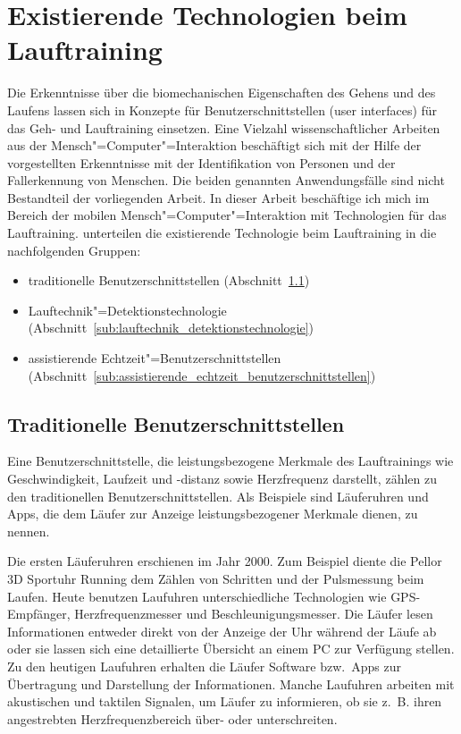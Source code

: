 

\section{Existierende Technologien beim Lauftraining} 

\label{sec:existierende_technologien_beim_lauftraining}

Die Erkenntnisse über die biomechanischen Eigenschaften des Gehens und des Laufens lassen sich in Konzepte für Benutzerschnittstellen (user interfaces) für das Geh- und Lauftraining einsetzen. Eine Vielzahl wissenschaftlicher Arbeiten aus der Mensch"=Computer"=Interaktion beschäftigt sich mit der Hilfe der vorgestellten Erkenntnisse mit der Identifikation von Personen und der Fallerkennung von Menschen. Die beiden genannten Anwendungsfälle sind nicht Bestandteil der vorliegenden Arbeit. In dieser Arbeit beschäftige ich mich im Bereich der mobilen Mensch"=Computer"=Interaktion mit Technologien für das Lauftraining. \citet{Jensen2014} unterteilen die existierende Technologie beim Lauftraining in die nachfolgenden Gruppen: 
\begin{itemize}
	\item traditionelle Benutzerschnittstellen (Abschnitt~\ref{sub:traditionelle_benutzerschnittstellen}) 
	\item Lauftechnik"=Detektionstechnologie (Abschnitt~\ref{sub:lauftechnik_detektionstechnologie}) 
	\item assistierende Echtzeit"=Benutzerschnittstellen (Abschnitt~\ref{sub:assistierende_echtzeit_benutzerschnittstellen}) 
\end{itemize}

\subsection{Traditionelle Benutzerschnittstellen} 

\label{sub:traditionelle_benutzerschnittstellen}

Eine Benutzerschnittstelle, die leistungsbezogene Merkmale des Lauftrainings wie Geschwindigkeit, Laufzeit und -distanz sowie Herzfrequenz darstellt, zählen \citet{Jensen2014} zu den traditionellen Benutzerschnittstellen. Als Beispiele sind Läuferuhren und Apps, die dem Läufer zur Anzeige leistungsbezogener Merkmale dienen, zu nennen.

Die ersten Läuferuhren erschienen im Jahr 2000. Zum Beispiel diente die Pellor 3D Sportuhr Running dem Zählen von Schritten und der Pulsmessung beim Laufen. Heute benutzen Laufuhren unterschiedliche Technologien wie \acs{GPS}-Empfänger, Herzfrequenzmesser und Beschleunigungsmesser. Die Läufer lesen Informationen entweder direkt von der Anzeige der Uhr während der Läufe ab oder sie lassen sich eine detaillierte Übersicht an einem PC zur Verfügung stellen. Zu den heutigen Laufuhren erhalten die Läufer Software bzw.\ Apps zur Übertragung und Darstellung der Informationen. Manche Laufuhren arbeiten mit akustischen und taktilen Signalen, um Läufer zu informieren, ob sie z.~B. ihren angestrebten Herzfrequenzbereich über- oder unterschreiten.

